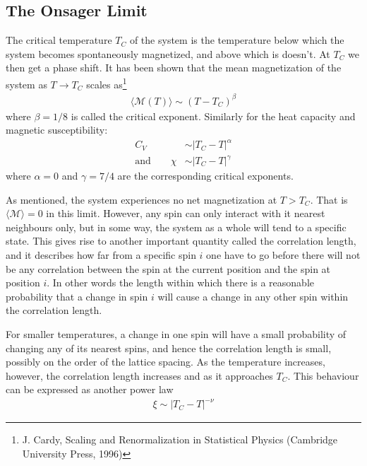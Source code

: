 \documentclass[twoside, 11pt]{article}
\begin{document}
	\subsection{The Onsager Limit}
		The critical temperature $T_C$ of the system is the temperature below which the system becomes spontaneously magnetized, and above which is doesn't. At $T_C$ we then get a phase shift. It has been shown that the mean magnetization of the system as $T \rightarrow T_C$ scales as\footnote{J. Cardy, Scaling and Renormalization in Statistical Physics (Cambridge University Press, 1996)}
		\begin{align*}
			\langle \mathcal{M} (T) \rangle \sim (T - T_C )^\beta
		\end{align*}
		where $\beta = 1/8$ is called the critical exponent. Similarly for the heat capacity and magnetic susceptibility:
		\begin{align*}
			C_V &\sim |T_C - T|^\alpha \\
			\mathrm{and} \qquad \chi &\sim |T_C - T|^\gamma
		\end{align*}
		where $\alpha = 0$ and $\gamma = 7/4$ are the corresponding critical exponents.
		
		As mentioned, the system experiences no net magnetization at $T > T_C$. That is $\langle \mathcal{M} \rangle = 0$ in this limit. However, any spin can only interact with it nearest neighbours only, but in some way, the system as a whole will tend to a specific state. This gives rise to another important quantity called the correlation length, and it describes how far from a specific spin $i$ one have to go before there will not be any correlation between the spin at the current position and the spin at position $i$. In other words the length within which there is a reasonable probability that a change in spin $i$ will cause a change in any other spin within the correlation length.
		
		For smaller temperatures, a change in one spin will have a small probability of changing any of its nearest spins, and hence the correlation length is small, possibly on the order of the lattice spacing. As the temperature increases, however, the correlation length increases and as it approaches $T_C$. This behaviour can be expressed as another power law
		\begin{align*}
			\xi \sim |T_C - T|^{-\nu}
		\end{align*}
		
\end{document}
